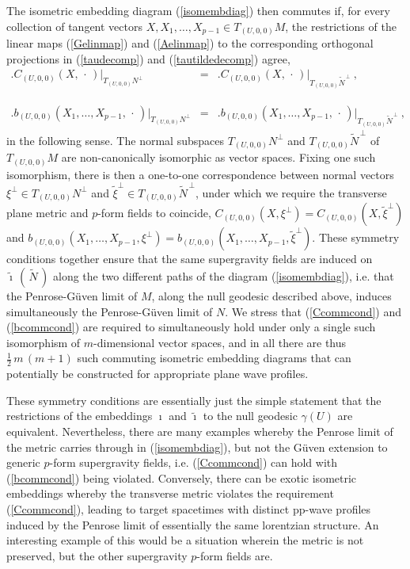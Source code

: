 \documentclass[11pt,a4paper]{article}
\def\nn{\nonumber}
\def\bea{\begin{eqnarray}}
\def\eea{\end{eqnarray}}
\begin{document}
The isometric embedding diagram (\ref{isomembdiag}) then commutes if,
for every collection of tangent vectors $X,X_1,\dots,X_{p-1}\in
T_{(U,0,0)}M$, the restrictions of the linear maps (\ref{Gelinmap})
and (\ref{Aelinmap}) to the corresponding orthogonal projections in
(\ref{taudecomp}) and (\ref{tautildedecomp}) agree,
\bea
\bigl.C_{(U,0,0)}(X,\,\cdot\,)\bigr|_{T_{(U,0,0)}N^\perp}&=&
\bigl.C_{(U,0,0)}(X,\,\cdot\,)\bigr|_{T_{(U,0,0)}
\widetilde{N}^{\,\perp}} \ , \label{Ccommcond}\\&&{~~~~}^{~~}_{~~}
\nn\\\bigl.b_{(U,0,0)}(X_1,\ldots,X_{p-1},\,\cdot\,)
\bigr|_{T_{(U,0,0)}N^\perp}&=&
\bigl.b_{(U,0,0)}(X_1,\ldots,X_{p-1},\,\cdot\,)\bigr|_{T_{(U,0,0)}
\widetilde{N}^{\,\perp}} \ ,
\label{bcommcond}\eea
in the following sense. The normal subspaces $T_{(U,0,0)}N^\perp$ and
$T_{(U,0,0)}\widetilde{N}^{\,\perp}$ of $T_{(U,0,0)}M$ are non-canonically
isomorphic as vector spaces. Fixing one such isomorphism, there is
then a one-to-one correspondence between normal vectors $\xi^\perp\in
T_{(U,0,0)}N^\perp$ and $\tilde\xi^\perp\in
T_{(U,0,0)}\widetilde{N}^{\,\perp}$, under which we require the
transverse plane metric and $p$-form fields to coincide,
$C_{(U,0,0)}(X,\xi^\perp)=C_{(U,0,0)}(X,\tilde\xi^\perp)$ and
$b_{(U,0,0)}(X_1,\ldots,X_{p-1},\xi^\perp)=b_{(U,0,0)}(X_1,\ldots,X_{p-1},\tilde
\xi^\perp)$. These symmetry conditions together ensure that the same
supergravity fields are induced on
$\widetilde{\imath}\,(\,\widetilde{N}\,)$ along the two different
paths of the diagram (\ref{isomembdiag}), i.e. that the
Penrose-G\"uven limit of $M$, along the null geodesic described above,
induces simultaneously the Penrose-G\"uven limit of $N$. We stress that
(\ref{Ccommcond}) and (\ref{bcommcond}) are required to simultaneously
hold under only a single such isomorphism of $m$-dimensional vector
spaces, and in all there are thus $\frac12\,m\,(m+1)$ such commuting
isometric embedding diagrams that can potentially be constructed for
appropriate plane wave profiles.

These symmetry conditions are essentially just the simple statement
that the restrictions of the embeddings $\imath$ and $\widetilde{\imath}$ to
the null geodesic $\gamma(U)$ are equivalent. Nevertheless, there are
many examples whereby the Penrose limit of the metric carries through
in (\ref{isomembdiag}), but not the G\"uven extension to generic
$p$-form supergravity fields, i.e. (\ref{Ccommcond}) can hold with
(\ref{bcommcond}) being violated. Conversely, there can be exotic
isometric embeddings whereby the transverse metric violates the
requirement (\ref{Ccommcond}), leading to target spacetimes with
distinct pp-wave profiles induced by the Penrose limit of essentially
the same lorentzian structure. An interesting example of this would
be a situation wherein the metric is not preserved, but the other
supergravity $p$-form fields are.
\end{document}
